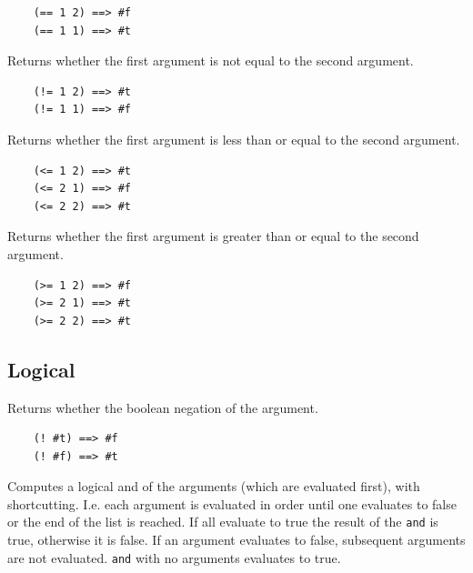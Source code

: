 \documentclass[12pt]{article}
\begin{document}
\begin{verbatim}
    (== 1 2) ==> #f
    (== 1 1) ==> #t
\end{verbatim}


Returns whether the first argument is not equal to the second argument.

\begin{verbatim}
    (!= 1 2) ==> #t
    (!= 1 1) ==> #f
\end{verbatim}


Returns whether the first argument is less than or equal to the second
argument. 

\begin{verbatim}
    (<= 1 2) ==> #t
    (<= 2 1) ==> #f
    (<= 2 2) ==> #t
\end{verbatim}


Returns whether the first argument is greater than or equal to the
second argument. 

\begin{verbatim}
    (>= 1 2) ==> #f
    (>= 2 1) ==> #t
    (>= 2 2) ==> #t
\end{verbatim}

\subsection{Logical}


Returns whether the boolean negation of the argument.

\begin{verbatim}
    (! #t) ==> #f
    (! #f) ==> #t
\end{verbatim}


Computes a logical and of the arguments (which are evaluated first),
with shortcutting. I.e. each argument is evaluated in order until one
evaluates to false or the end of the list is reached. If all evaluate
to true the result of the \verb|and| is true, otherwise it is false.
If an argument evaluates to false, subsequent arguments are not
evaluated. \verb|and| with no arguments evaluates to true.

\begin{verbatim}
  
\end{verbatim}
\end{document}
